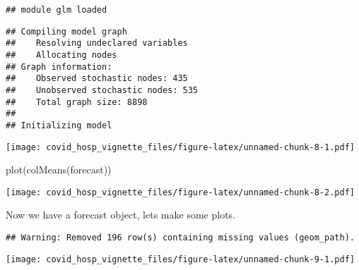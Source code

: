 \documentclass[
]{article}
\newenvironment{Shaded}{\begin{snugshade}}{\end{snugshade}}
\newcommand{\AttributeTok}[1]{\textcolor[rgb]{0.77,0.63,0.00}{#1}}
\newcommand{\DecValTok}[1]{\textcolor[rgb]{0.00,0.00,0.81}{#1}}
\newcommand{\FunctionTok}[1]{\textcolor[rgb]{0.00,0.00,0.00}{#1}}
\newcommand{\NormalTok}[1]{#1}
\newcommand{\OtherTok}[1]{\textcolor[rgb]{0.56,0.35,0.01}{#1}}
\newcommand{\SpecialCharTok}[1]{\textcolor[rgb]{0.00,0.00,0.00}{#1}}
\newcommand{\StringTok}[1]{\textcolor[rgb]{0.31,0.60,0.02}{#1}}
\begin{document}
\begin{verbatim}
## module glm loaded
\end{verbatim}

\begin{verbatim}
## Compiling model graph
##    Resolving undeclared variables
##    Allocating nodes
## Graph information:
##    Observed stochastic nodes: 435
##    Unobserved stochastic nodes: 535
##    Total graph size: 8898
## 
## Initializing model
\end{verbatim}

\texttt{[image: covid\_hosp\_vignette\_files/figure-latex/unnamed-chunk-8-1.pdf]}

\begin{Shaded}
\begin{Highlighting}[]
\FunctionTok{plot}\NormalTok{(}\FunctionTok{colMeans}\NormalTok{(forecast))}
\end{Highlighting}
\end{Shaded}

\texttt{[image: covid\_hosp\_vignette\_files/figure-latex/unnamed-chunk-8-2.pdf]}

Now we have a forecast object, lets make some plots.

\begin{Shaded}
\end{Shaded}

\begin{verbatim}
## Warning: Removed 196 row(s) containing missing values (geom_path).
\end{verbatim}

\texttt{[image: covid\_hosp\_vignette\_files/figure-latex/unnamed-chunk-9-1.pdf]}
\end{document}
